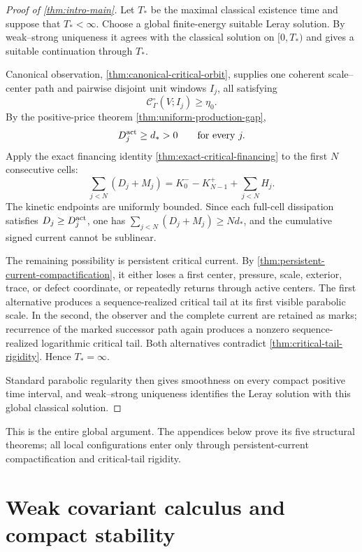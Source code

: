 \documentclass[11pt]{amsart}
\numberwithin{equation}{section}
\theoremstyle{plain}
\theoremstyle{definition}
\theoremstyle{remark}
\newcommand{\OscMass}{\mathcal C^{\circ}}
\begin{document}
\begin{proof}[Proof of \cref{thm:intro-main}]
Let \(T_*\) be the maximal classical existence time and suppose that
\(T_*<\infty\).  Choose a global finite-energy suitable Leray solution.  By
weak--strong uniqueness it agrees with the classical solution on
\([0,T_*)\) and gives a suitable continuation through \(T_*\).

Canonical observation, \cref{thm:canonical-critical-orbit}, supplies one
coherent scale--center path and pairwise disjoint unit windows
\(I_j\), all satisfying
\[
 \OscMass_\Gamma(V;I_j)\ge\eta_0.
\]
By the positive-price theorem \cref{thm:uniform-production-gap},
\[
 D_j^{\rm act}\ge d_*>0
 \qquad\text{for every }j.
\]
Apply the exact financing identity
\cref{thm:exact-critical-financing} to the first \(N\) consecutive cells:
\[
 \sum_{j<N}(D_j+M_j)
 =K_0^- -K_{N-1}^+ +\sum_{j<N}H_j .
\]
The kinetic endpoints are uniformly bounded.  Since each full-cell
dissipation satisfies \(D_j\ge D_j^{\rm act}\), one has
\(\sum_{j<N}(D_j+M_j)\ge Nd_*\), and the cumulative signed current cannot be
sublinear.

The remaining possibility is persistent critical current.  By
\cref{thm:persistent-current-compactification}, it either loses a first
center, pressure, scale, exterior, trace, or defect coordinate, or repeatedly
returns through active centers.  The first alternative produces a
sequence-realized critical tail at its first visible parabolic scale.  In the
second, the observer and the complete current are retained as marks; recurrence
of the marked successor path again produces a nonzero sequence-realized
logarithmic critical tail.  Both alternatives contradict
\cref{thm:critical-tail-rigidity}.  Hence \(T_*=\infty\).

Standard parabolic regularity then gives smoothness on every compact positive
time interval, and weak--strong uniqueness identifies the Leray solution with
this global classical solution.
\end{proof}

This is the entire global argument.  The appendices below prove its five
structural theorems; all local configurations enter only through
persistent-current compactification and critical-tail rigidity.

\clearpage
\appendix

\section{Weak covariant calculus and compact stability}
\label{app:weak-calculus}
\label{sec:weak-extension}
\end{document}
